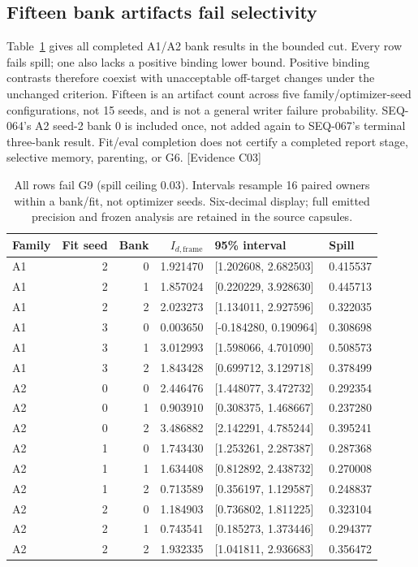 \documentclass[11pt]{article}
\newcommand{\ev}[1]{\textsf{[Evidence #1]}}
\begin{document}
\subsection{Fifteen bank artifacts fail selectivity}
Table~\ref{tab:banks} gives all completed A1/A2 bank results in the bounded cut.
Every row fails spill; one also lacks a positive binding lower bound. Positive
binding contrasts therefore coexist with unacceptable off-target changes under
the unchanged criterion. Fifteen is an artifact count across five
family/optimizer-seed configurations, not 15 seeds, and is not a general writer
failure probability. SEQ-064's A2 seed-2 bank 0 is included once, not added again
to SEQ-067's terminal three-bank result. Fit/eval completion does not certify a
completed report stage, selective memory, parenting, or G6. \ev{C03}

\begin{table}[htbp]
\centering\small
\begin{tabular}{lrrrll}
\toprule
Family & Fit seed & Bank & $I_{d,\mathrm{frame}}$ & 95\% interval & Spill \\
\midrule
A1 & 2 & 0 & 1.921470 & [1.202608, 2.682503] & 0.415537 \\
A1 & 2 & 1 & 1.857024 & [0.220229, 3.928630] & 0.445713 \\
A1 & 2 & 2 & 2.023273 & [1.134011, 2.927596] & 0.322035 \\
A1 & 3 & 0 & 0.003650 & [-0.184280, 0.190964] & 0.308698 \\
A1 & 3 & 1 & 3.012993 & [1.598066, 4.701090] & 0.508573 \\
A1 & 3 & 2 & 1.843428 & [0.699712, 3.129718] & 0.378499 \\
A2 & 0 & 0 & 2.446476 & [1.448077, 3.472732] & 0.292354 \\
A2 & 0 & 1 & 0.903910 & [0.308375, 1.468667] & 0.237280 \\
A2 & 0 & 2 & 3.486882 & [2.142291, 4.785244] & 0.395241 \\
A2 & 1 & 0 & 1.743430 & [1.253261, 2.287387] & 0.287368 \\
A2 & 1 & 1 & 1.634408 & [0.812892, 2.438732] & 0.270008 \\
A2 & 1 & 2 & 0.713589 & [0.356197, 1.129587] & 0.248837 \\
A2 & 2 & 0 & 1.184903 & [0.736802, 1.811225] & 0.323104 \\
A2 & 2 & 1 & 0.743541 & [0.185273, 1.373446] & 0.294377 \\
A2 & 2 & 2 & 1.932335 & [1.041811, 2.936683] & 0.356472 \\
\bottomrule
\end{tabular}
\caption{All rows fail G9 (spill ceiling 0.03). Intervals resample 16 paired
owners within a bank/fit, not optimizer seeds. Six-decimal display; full emitted
precision and frozen analysis are retained in the source capsules.}
\label{tab:banks}
\end{table}
\end{document}

